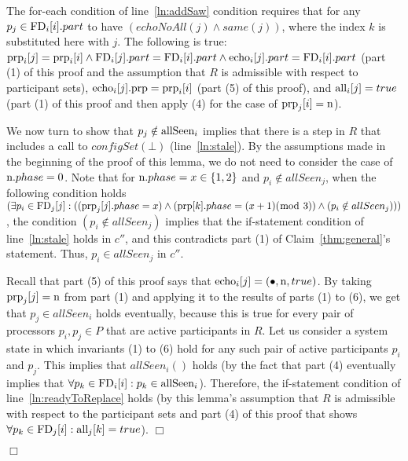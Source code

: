\documentclass[11pt]{article}
\newcommand{\notif}{prp}
\newenvironment{proof}{\noindent{\bf Proof.}}{\hfill$\Box$}
\begin{document}
\begin{proof}
\begin{proof}
The for-each condition of line~\ref{ln:addSaw} condition requires that for any $p_j \in \textnormal{FD}_i[i].part$ to have $(echoNoAll(j) \land same(j))$, where the index $k$ is substituted here with $j$. The following is true: $\textnormal{\notif}_i[j] = \textnormal{\notif}_i[i] \land \textnormal{FD}_i[j].part = \textnormal{FD}_i[i].part \land \textnormal{echo}_i[j].part = \textnormal{FD}_i[i].part$  (part (1) of this proof and the assumption that $R$ is admissible with respect to participant sets), $\textnormal{echo}_i[j].\textnormal{\notif} = \textnormal{\notif}_i[i]$ (part (5) of this proof), and $\textnormal{all}_i[j] = true$ (part (1) of this proof and then apply (4) for the case of $\textnormal{\notif}_j[i]=\textnormal{n}$).

We now turn to show that $p_j \notin \textnormal{allSeen}_i$ implies that there is a step in $R$ that includes a call to  $configSet(\bot)$ (line~\ref{ln:stale}).
By the assumptions made in the beginning of the proof of this lemma, we do not need to consider the case of $\textnormal{n}.phase=0$. Note that for $\textnormal{n}.phase=x \in \{ 1, 2 \}$ and $p_i \notin allSeen_j$, when the following condition holds $(\exists p_i \in \textnormal{FD}_j[j] : ((\textnormal{\notif}_j[j].phase =x) \land (\textnormal{\notif}[k].phase =(x+1)(\bmod ~3)) \land (p_i \notin allSeen_j)))$, the condition $(p_i \notin allSeen_j)$ implies that the if-statement condition of line~\ref{ln:stale} holds in $c''$, and this contradicts part (1) of Claim~\ref{thm:general}'s statement. Thus, $p_i \in allSeen_j$ in $c''$. 


 Recall that part (5) of this proof says that $\textnormal{echo}_i[j] = (\bullet, \textnormal{n}, true)$. By taking $\textnormal{\notif}_j[j]=\textnormal{n}$  from part (1) and applying it to the results of parts (1) to (6), we get that $p_j \in allSeen_i$ holds eventually, because this is true for every pair of processors $p_i,p_j \in P$ that are active participants in $R$. Let us consider a system state in which invariants (1) to (6) hold for any such pair of active participants $p_i$ and $p_j$.
This implies that $allSeen_i()$ holds (by the fact that part (4) eventually implies that $\forall p_k \in \textnormal{FD}_i[i]: p_k \in \textnormal{allSeen}_i$). Therefore, the if-statement condition of line~\ref{ln:readyToReplace} holds (by this lemma's assumption that $R$ is admissible with respect to the participant sets and part (4) of this proof that shows $\forall p_k \in \textnormal{FD}_j[i]: \textnormal{all}_j[k]=true$).
\end{proof}


\end{proof}
\end{document}

